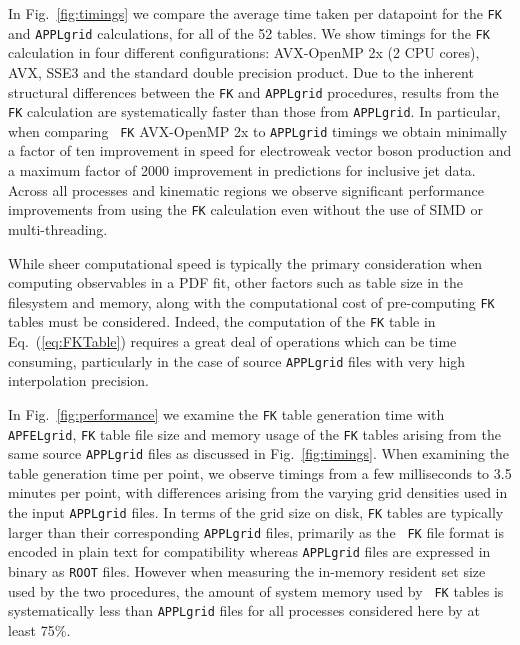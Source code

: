 \documentclass[preprint,12pt]{elsarticle}
\begin{document}
In Fig.~\ref{fig:timings} we compare the average time taken per
datapoint for the {\tt FK} and {\tt APPLgrid} calculations, for all of
the 52 tables. We show timings for the {\tt FK} calculation in four
different configurations: AVX-OpenMP 2x (2 CPU cores), AVX, SSE3 and
the standard double precision product. Due to the inherent structural
differences between the {\tt FK} and {\tt APPLgrid} procedures,
results from the {\tt FK} calculation are systematically faster than
those from {\tt APPLgrid}. In particular, when comparing {\tt
  FK} AVX-OpenMP 2x to {\tt APPLgrid} timings we obtain minimally a factor of
ten improvement in speed for electroweak vector boson production and a
maximum factor of 2000 improvement in predictions for inclusive jet
data. Across all processes and kinematic regions we observe
significant performance improvements from using the {\tt FK}
calculation even without the use of SIMD or multi-threading.

While sheer computational speed is typically the primary consideration
when com\-pu\-ting observables in a PDF fit, other factors such as
table size in the filesystem and memory, along with the computational
cost of pre-computing {\tt FK} tables must be considered. Indeed, the
computation of the {\tt FK} table in Eq.~(\ref{eq:FKTable}) requires a
great deal of operations which can be time consuming, particularly in
the case of source {\tt APPLgrid} files with very high interpolation
precision.

In Fig.~\ref{fig:performance} we examine the {\tt FK} table generation
time with {\tt APFELgrid}, {\tt FK} table file size and memory usage
of the {\tt FK} tables arising from the same source {\tt APPLgrid}
files as discussed in Fig.~\ref{fig:timings}.  When examining the
table generation time per point, we observe timings from a few
milliseconds to 3.5 minutes per point, with differences arising from
the varying grid densities used in the input {\tt APPLgrid} files.  In
terms of the grid size on disk, {\tt FK} tables are typically larger
than their corresponding {\tt APPLgrid} files, primarily as the {\tt
  FK} file format is encoded in plain text for compatibility whereas
{\tt APPLgrid} files are expressed in binary as {\tt ROOT}
files. However when measuring the in-memory resident set size used by
the two procedures, the amount of system memory used by {\tt
  FK} tables is systematically less than {\tt APPLgrid} files for all
processes considered here by at least 75\%.

\end{document}
